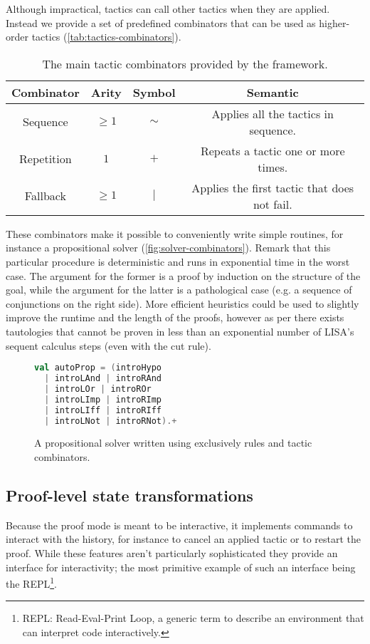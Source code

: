 Although impractical, tactics can call other tactics when they are applied. Instead we provide a set of predefined combinators that can be used as higher-order tactics (\autoref{tab:tactics-combinators}).

\begin{table}[hbt!]
  \centering
  \begin{tabular}{||c c c c||}
  \hline
  \textbf{Combinator} & \textbf{Arity} & \textbf{Symbol} & \textbf{Semantic} \\
  \hline\hline
  Sequence & $\geq 1$ & $\sim$ & Applies all the tactics in sequence. \\ \hline
  Repetition & $1$ & $+$ & Repeats a tactic one or more times. \\ \hline
  Fallback & $\geq 1$ & $|$ & Applies the first tactic that does not fail. \\ \hline
  \end{tabular}
  \caption[Available combinators]{The main tactic combinators provided by the framework.}
  \label{tab:tactics-combinators}
\end{table}

These combinators make it possible to conveniently write simple routines, for instance a propositional solver (\autoref{fig:solver-combinators}). Remark that this particular procedure is deterministic and runs in exponential time in the worst case. The argument for the former is a proof by induction on the structure of the goal, while the argument for the latter is a pathological case (e.g. a sequence of conjunctions on the right side). More efficient heuristics could be used to slightly improve the runtime and the length of the proofs, however as per \cite{Krajicek1994} there exists tautologies that cannot be proven in less than an exponential number of LISA's sequent calculus steps (even with the cut rule).

\begin{figure}[hbt!]
  \centering
  \begin{lstlisting}[language=Scala]
val autoProp = (introHypo
  | introLAnd | introRAnd
  | introLOr | introROr
  | introLImp | introRImp
  | introLIff | introRIff
  | introLNot | introRNot).+
  \end{lstlisting}
  \caption[Propositional solver]{A propositional solver written using exclusively rules and tactic combinators.}
  \label{fig:solver-combinators}
\end{figure}

\subsection{Proof-level state transformations}

Because the proof mode is meant to be interactive, it implements commands to interact with the history, for instance to cancel an applied tactic or to restart the proof. While these features aren't particularly sophisticated they provide an interface for interactivity; the most primitive example of such an interface being the REPL\footnote{REPL: Read-Eval-Print Loop, a generic term to describe an environment that can interpret code interactively.}.
